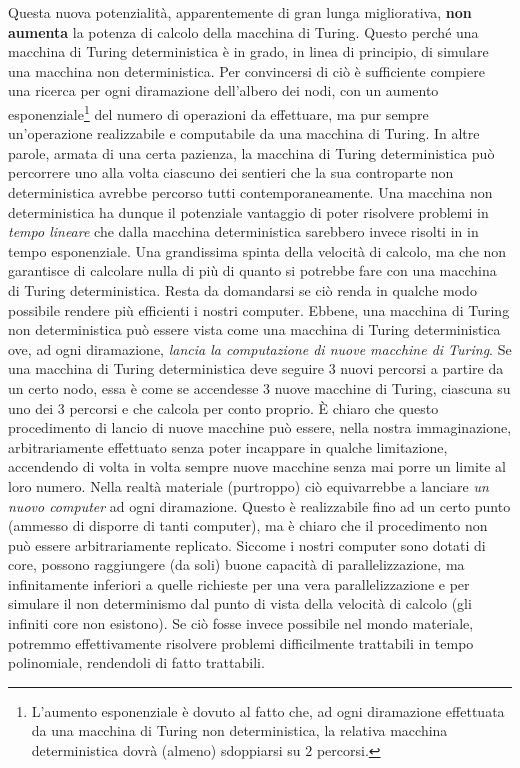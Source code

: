 \documentclass[10pt]{\classname}
\theoremstyle{definition}
\theoremstyle{definition}
\begin{document}
Questa nuova potenzialità, apparentemente di
gran lunga migliorativa, \textbf{non aumenta} la potenza di calcolo della
macchina di Turing. Questo perché una macchina di Turing deterministica è in grado, in linea di principio, di
simulare una macchina non deterministica. Per convincersi di ciò è sufficiente
compiere una ricerca per ogni diramazione dell'albero dei nodi, con un aumento
esponenziale\footnote{L'aumento esponenziale è dovuto al fatto che, ad ogni
diramazione effettuata da una macchina di Turing non deterministica, la
relativa macchina deterministica dovrà (almeno) sdoppiarsi su $2$ percorsi.}
del numero di operazioni da effettuare, ma pur sempre un'operazione
realizzabile e computabile da una macchina di Turing. In altre parole, armata
di una certa pazienza, la macchina di Turing deterministica può percorrere uno
alla volta ciascuno dei sentieri che la sua controparte non deterministica
avrebbe percorso tutti contemporaneamente. Una macchina non deterministica ha
dunque il potenziale vantaggio di poter risolvere problemi in \emph{tempo
lineare} che dalla macchina deterministica sarebbero invece risolti in in tempo
esponenziale. Una grandissima spinta della velocità di calcolo, ma che non
garantisce di calcolare nulla di più di quanto si potrebbe fare con una
macchina di Turing deterministica. Resta da domandarsi se ciò renda in qualche
modo possibile rendere più efficienti i nostri computer. Ebbene, una macchina
di Turing non deterministica può essere vista come una macchina di Turing
deterministica ove, ad ogni diramazione, \emph{lancia la computazione di nuove
macchine di Turing}. Se una macchina di Turing deterministica deve seguire 3
nuovi percorsi a partire da un certo nodo, essa è come se accendesse 3 nuove
macchine di Turing, ciascuna su uno dei 3 percorsi e che calcola per conto
proprio. È chiaro che questo procedimento di lancio di nuove macchine può
essere, nella nostra immaginazione, arbitrariamente effettuato senza poter
incappare in qualche limitazione, accendendo di volta in volta sempre nuove macchine senza mai porre un limite al loro numero. Nella realtà materiale (purtroppo) ciò
equivarrebbe a lanciare \emph{un nuovo computer} ad ogni diramazione. Questo è
realizzabile fino ad un certo punto (ammesso di disporre di tanti computer), ma
è chiaro che il procedimento non può essere arbitrariamente replicato. Siccome
i nostri computer sono dotati di core, possono raggiungere (da soli) buone
capacità di parallelizzazione, ma infinitamente inferiori a quelle richieste
per una vera parallelizzazione e per simulare il non determinismo dal punto di
vista della velocità di calcolo (gli infiniti core non esistono). Se ciò fosse
invece possibile nel mondo materiale, potremmo effettivamente risolvere
problemi difficilmente trattabili in tempo polinomiale, rendendoli di fatto
trattabili.
\end{document}
